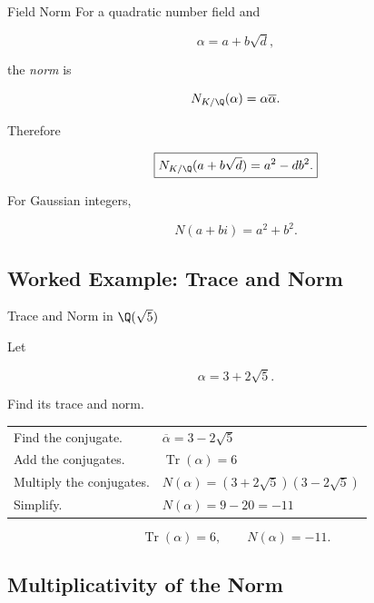\begin{definitionbox}{Field Norm}
For a quadratic number field and

\[ \alpha=a+b\sqrt d, \]

the \emph{norm} is

\[ N_{K/\Q}(\alpha)=\alpha\overline{\alpha}. \]
\end{definitionbox}

Therefore

\[ \boxed{N_{K/\Q}(a+b\sqrt d)=a^2-db^2.} \]

For Gaussian integers,

\[ N(a+bi)=a^2+b^2. \]

\subsection{Worked Example: Trace and Norm}
\label{subsec:worked-trace-norm}

\begin{workedexamplebox}{Trace and Norm in \(\Q(\sqrt5)\)}

Let

\[ \alpha=3+2\sqrt5. \]

Find its trace and norm.

\begin{tabularx}{\textwidth}{@{}>{\raggedright\arraybackslash}p{}X@{}}
Find the conjugate. &
\(\overline{\alpha}=3-2\sqrt5\)\\
Add the conjugates. &
\(\operatorname{Tr}(\alpha)=6\)\\
Multiply the conjugates. &
\(N(\alpha)=(3+2\sqrt5)(3-2\sqrt5)\)\\
Simplify. &
\(N(\alpha)=9-20=-11\)
\end{tabularx}

\begin{answerbox}
\[ \boxed{\operatorname{Tr}(\alpha)=6,\qquad N(\alpha)=-11.} \]
\end{answerbox}
\end{workedexamplebox}

\subsection{Multiplicativity of the Norm}
\label{subsec:norm-multiplicative}


